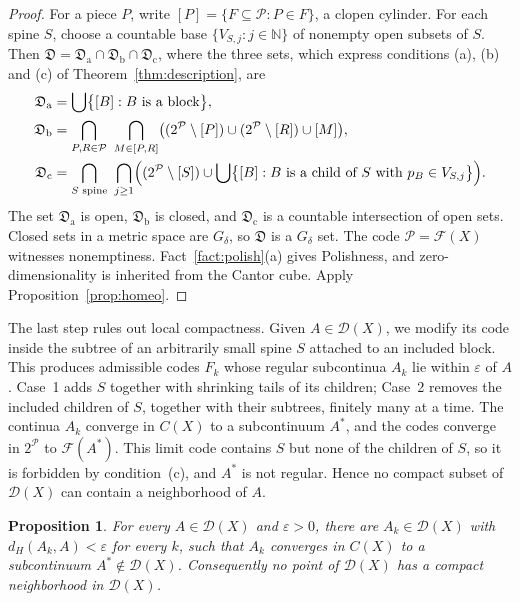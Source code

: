 \documentclass[11pt]{amsart}
\newtheorem{proposition}[theorem]{Proposition}
\theoremstyle{definition}
\theoremstyle{remark}
\newcommand{\D}{\mathcal{D}}
\newcommand{\Pc}{\mathcal{P}}
\newcommand{\Fc}{\mathcal{F}}
\newcommand{\Dc}{\mathfrak{D}}
\newcommand{\N}{\mathbb{N}}
\newcommand{\dH}{d_H}
\begin{document}
\begin{proof}
For a piece $P$, write $[P]=\{F\subseteq\Pc: P\in F\}$, a clopen cylinder. For each spine $S$, choose a countable base $\{V_{S,j}: j\in\N\}$ of nonempty open subsets of $S$. Then $\Dc=\Dc_{\mathrm a}\cap\Dc_{\mathrm b}\cap\Dc_{\mathrm c}$, where the three sets, which express conditions (a), (b) and (c) of Theorem~\ref{thm:description}, are
\begin{align*}
\Dc_{\mathrm a}&=\bigcup\bigl\{[B]: B\text{ is a block}\bigr\},\\
\Dc_{\mathrm b}&=\bigcap_{P,R\in\Pc}\ \bigcap_{M\in[P,R]}\bigl((2^\Pc\setminus[P])\cup(2^\Pc\setminus[R])\cup[M]\bigr),\\
\Dc_{\mathrm c}&=\bigcap_{S\text{ spine}}\ \bigcap_{j\ge1}\Bigl((2^\Pc\setminus[S])\cup\bigcup\bigl\{[B]: B\text{ is a child of }S\text{ with }p_B\in V_{S,j}\bigr\}\Bigr).
\end{align*}
The set $\Dc_{\mathrm a}$ is open, $\Dc_{\mathrm b}$ is closed, and $\Dc_{\mathrm c}$ is a countable intersection of open sets. Closed sets in a metric space are $G_\delta$, so $\Dc$ is a $G_\delta$ set. The code $\Pc=\Fc(X)$ witnesses nonemptiness. Fact~\ref{fact:polish}(a) gives Polishness, and zero-dimensionality is inherited from the Cantor cube. Apply Proposition~\ref{prop:homeo}.
\end{proof}

The last step rules out local compactness. Given $A\in\D(X)$, we modify its code inside the subtree of an arbitrarily small spine $S$ attached to an included block. This produces admissible codes $F_k$ whose regular subcontinua $A_k$ lie within $\varepsilon$ of $A$. Case~1 adds $S$ together with shrinking tails of its children; Case~2 removes the included children of $S$, together with their subtrees, finitely many at a time. The continua $A_k$ converge in $C(X)$ to a subcontinuum $A^*$, and the codes converge in $2^\Pc$ to $\Fc(A^*)$. This limit code contains $S$ but none of the children of $S$, so it is forbidden by condition~(c), and $A^*$ is not regular. Hence no compact subset of $\D(X)$ can contain a neighborhood of $A$.

\begin{proposition}\label{prop:nlc}
For every $A\in\D(X)$ and $\varepsilon>0$, there are $A_k\in\D(X)$ with $\dH(A_k,A)<\varepsilon$ for every $k$, such that $A_k$ converges in $C(X)$ to a subcontinuum $A^*\notin\D(X)$. Consequently no point of $\D(X)$ has a compact neighborhood in $\D(X)$.
\end{proposition}
\end{document}
